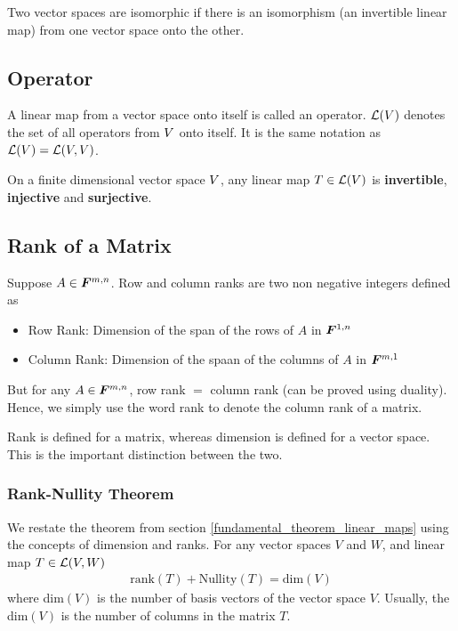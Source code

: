\documentclass[../../linear_algebra.tex]{subfiles}
\begin{document}
Two vector spaces are isomorphic if there is an isomorphism (an invertible linear map) from one vector space onto the other.


\subsection{Operator}
A linear map from a vector space onto itself is called an operator. $\mathcal{L}(V)$ denotes the set of all operators from $V$ onto itself. It is the same notation as $\mathcal{L}(V) = \mathcal{L}(V, V)$.\newline

On a finite dimensional vector space $V$, any linear map $T \in \mathcal{L}(V)$ is \textbf{invertible}, \textbf{injective} and \textbf{surjective}.

\subsection{Rank of a Matrix}
Suppose $A \in \bm{F}^{m, n}$. Row and column ranks are two non negative integers defined as
\begin{itemize}
    \item Row Rank: Dimension of the span of the rows of $A$ in $\bm{F}^{1, n}$
    \item Column Rank: Dimension of the spaan of the columns of $A$ in $\bm{F}^{m, 1}$
\end{itemize}
But for any $A \in \bm{F}^{m, n}$, row rank $=$ column rank (can be proved using duality). Hence, we simply use the word rank to denote the column rank of a matrix.\newline

Rank is defined for a matrix, whereas dimension is defined for a vector space. This is the important distinction between the two.

\subsubsection{Rank-Nullity Theorem}\label{rank_nullity_theorem}
We restate the theorem from section \ref{fundamental_theorem_linear_maps} using the concepts of dimension and ranks. For any vector spaces $V$ and $W$, and linear map $T \in \mathcal{L}(V, W)$
\begin{align*}
    \text{rank}(T) + \text{Nullity}(T) = \text{dim}(V)
\end{align*}
where dim$(V)$ is the number of basis vectors of the vector space $V$. Usually, the dim$(V)$ is the number of columns in the matrix $T$.
\end{document}
